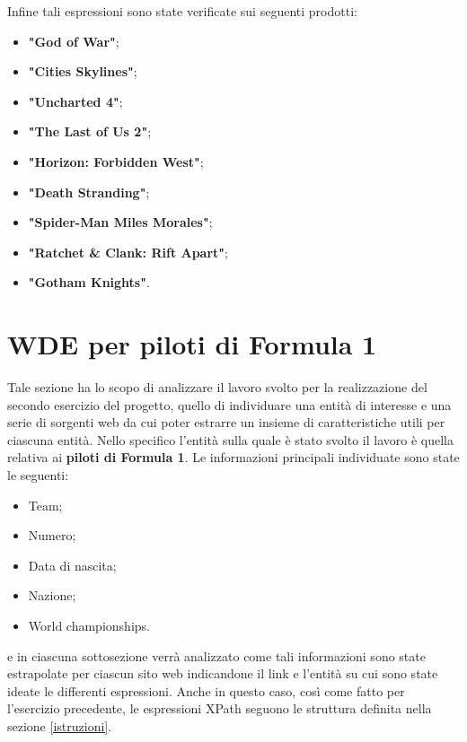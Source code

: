 \documentclass[12pt, letterpaper]{article}
\begin{document}
Infine tali espressioni sono state verificate sui seguenti prodotti: 
\begin{itemize}
	\item \textbf{"God of War"};
	\item \textbf{"Cities Skylines"};
	\item \textbf{"Uncharted 4"};
	\item \textbf{"The Last of Us 2"};
	\item \textbf{"Horizon: Forbidden West"};
	\item \textbf{"Death Stranding"};
	\item \textbf{"Spider-Man Miles Morales"};
	\item \textbf{"Ratchet \& Clank: Rift Apart"};
	\item \textbf{"Gotham Knights"}.
	
\end{itemize}

\section{WDE per piloti di Formula 1}\label{sezione2}
Tale sezione ha lo scopo di analizzare il lavoro svolto per la realizzazione del secondo esercizio del progetto, quello di individuare una entità di interesse e una serie di sorgenti web da cui poter estrarre un insieme di caratteristiche utili per ciascuna entità. Nello specifico l'entità sulla quale è stato svolto il lavoro è quella relativa ai \textbf{piloti di Formula 1}. Le informazioni principali individuate sono state le seguenti:
\begin{itemize}
    \item Team;
    \item Numero;
    \item Data di nascita;
    \item Nazione;
    \item World championships.
\end{itemize}
e in ciascuna sottosezione verrà analizzato come tali informazioni sono state estrapolate per ciascun sito web indicandone il link e l'entità su cui sono state ideate le differenti espressioni. Anche in questo caso, così come fatto per l'esercizio precedente, le espressioni XPath seguono le struttura definita nella sezione \ref{istruzioni}.
\end{document}
